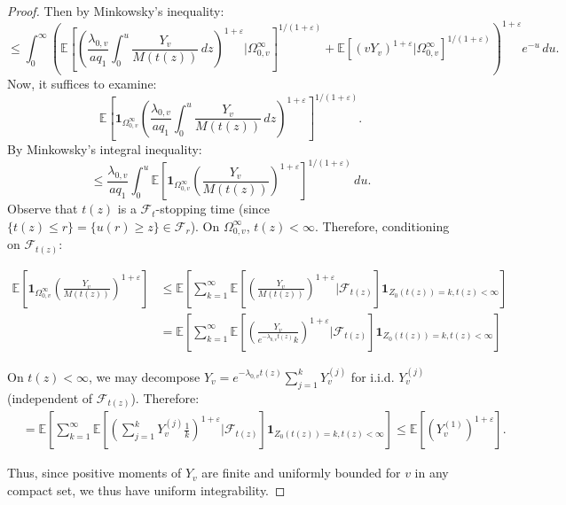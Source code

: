 \documentclass{article}
\numberwithin{equation}{section}
\begin{document}
\begin{proof}
Then by Minkowsky's inequality:
\[\leq \int_0^\infty \left(\mathbb{E}\left[\left(\frac{\lambda_{0,v}}{aq_1}\int_0^u \frac{Y_v}{M(t(z))}\,dz\right)^{1+\varepsilon}|\Omega_{0,v}^\infty\right]^{1/(1+\varepsilon)}+\mathbb{E}\left[(vY_v)^{1+\varepsilon}|\Omega_{0,v}^\infty\right]^{1/(1+\varepsilon)}\right)^{1+\varepsilon}e^{-u}\,du.\]
Now, it suffices to examine:
\[\mathbb{E}\left[\mathbf{1}_{\Omega_{0,v}^\infty}\left(\frac{\lambda_{0,v}}{aq_1}\int_0^u \frac{Y_v}{M(t(z))}\,dz\right)^{1+\varepsilon}\right]^{1/(1+\varepsilon)}.\]
By Minkowsky's integral inequality:
\[\leq \frac{\lambda_{0,v}}{aq_1}\int_0^u \mathbb{E}\left[\mathbf{1}_{\Omega_{0,v}^\infty}\left(\frac{Y_v}{M(t(z))}\right)^{1+\varepsilon}\right]^{1/(1+\varepsilon)}\,du.\]
Observe that $t(z)$ is a $\mathcal{F}_t$-stopping time (since $\{t(z)\leq r\}=\{u(r)\geq z\}\in\mathcal{F}_r$). On $\Omega_{0,v}^\infty$, $t(z)<\infty$. Therefore, conditioning on $\mathcal{F}_{t(z)}$:

\begin{align*}
    \mathbb{E}\left[\mathbf{1}_{\Omega_{0,v}^\infty}\left(\frac{Y_v}{M(t(z))}\right)^{1+\varepsilon}\right]&\leq \mathbb{E}\left[\sum_{k=1}^\infty \mathbb{E}\left[\left(\frac{Y_v}{M(t(z))}\right)^{1+\varepsilon}|\mathcal{F}_{t(z)}\right]\mathbf{1}_{Z_0(t(z))=k,t(z)<\infty}\right]\\
    &=\mathbb{E}\left[\sum_{k=1}^\infty \mathbb{E}\left[\left(\frac{Y_v}{e^{-\lambda_{0,v}t(z)}k}\right)^{1+\varepsilon}|\mathcal{F}_{t(z)}\right]\mathbf{1}_{Z_0(t(z))=k,t(z)<\infty}\right]
\end{align*}

On $t(z)<\infty$, we may decompose $Y_v=e^{-\lambda_{0,v}t(z)}\sum_{j=1}^k Y_v^{(j)}$ for i.i.d. $Y_v^{(j)}$ (independent of $\mathcal{F}_{t(z)}$). Therefore:
\begin{align*}
    &=\mathbb{E}\left[\sum_{k=1}^\infty \mathbb{E}\left[\left(\sum_{j=1}^k Y_v^{(j)}\frac{1}{k}\right)^{1+\varepsilon}|\mathcal{F}_{t(z)}\right]\mathbf{1}_{Z_0(t(z))=k,t(z)<\infty}\right]\leq \mathbb{E}[(Y_v^{(1)})^{1+\varepsilon}].
\end{align*}

Thus, since positive moments of $Y_v$ are finite and uniformly bounded for $v$ in any compact set, we thus have uniform integrability.
\end{proof}
\end{document}
